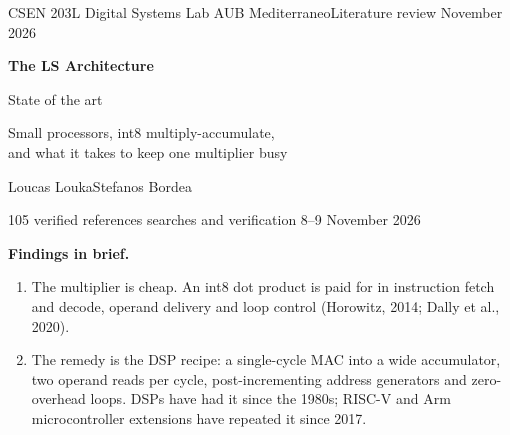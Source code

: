 \begin{titlepage}
\thispagestyle{empty}
{\sffamily\small\color{lsgrey}CSEN 203L Digital Systems Lab \textperiodcentered{} AUB Mediterraneo\hfill Literature review \textperiodcentered{} November 2026\par}
\vspace{6mm}
\begin{center}\end{center}
\vspace{4mm}
{\sffamily\fontsize{34}{38}\selectfont\bfseries\color{lsnavy}The LS Architecture\par}
\vspace{2mm}
{\sffamily\fontsize{24}{28}\selectfont\color{lsnavy}State of the art\par}
\vspace{5mm}
{\sffamily\Large\color{lsamber}Small processors, int8 multiply-accumulate,\\ and what it takes to keep one multiplier busy\par}
\vspace{6mm}
{\Large Loucas Louka\quad\textperiodcentered\quad Stefanos Bordea\par}
\vspace{2.5mm}
{\color{lsgrey}105 verified references \textperiodcentered{} searches and verification 8--9 November 2026\par}
\vfill
\begin{tcolorbox}[lsbase,breakable=false,colback=lspaper,borderline west={3pt}{0pt}{lsamber}]
\small\textbf{Findings in brief.}
\begin{enumerate}[leftmargin=1.4em,itemsep=0.1em]
\item The multiplier is cheap. An int8 dot product is paid for in instruction fetch and decode, operand delivery and loop control (Horowitz, 2014; Dally et al., 2020).
\item The remedy is the DSP recipe: a single-cycle MAC into a wide accumulator, two operand reads per cycle, post-incrementing address generators and zero-overhead loops. DSPs have had it since the 1980s; RISC-V and Arm microcontroller extensions have repeated it since 2017.

\end{enumerate}
\end{tcolorbox}
\end{titlepage}
